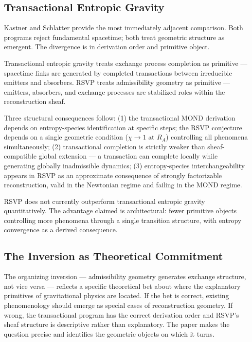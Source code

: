\documentclass[11pt, a4paper]{article}
\theoremstyle{plain}
\theoremstyle{definition}
\theoremstyle{remark}
\newcommand{\RA}{R_{\!A}}
\begin{document}
\subsection{Transactional Entropic Gravity}

Kastner and Schlatter \cite{kastner2024} provide the most immediately adjacent
comparison. Both programs reject fundamental spacetime; both treat geometric structure
as emergent. The divergence is in derivation order and primitive object.

Transactional entropic gravity treats exchange process completion as primitive ---
spacetime links are generated by completed transactions between irreducible emitters
and absorbers. RSVP treats admissibility geometry as primitive --- emitters,
absorbers, and exchange processes are stabilized roles within the reconstruction
sheaf.

Three structural consequences follow: (1) the transactional MOND derivation depends
on entropy-species identification at specific steps; the RSVP conjecture depends on a
single geometric condition ($\chi \to 1$ at $\RA$) controlling all phenomena
simultaneously; (2) transactional completion is strictly weaker than sheaf-compatible
global extension --- a transaction can complete locally while generating globally
inadmissible dynamics; (3) entropy-species interchangeability appears in RSVP as an
approximate consequence of strongly factorizable reconstruction, valid in the
Newtonian regime and failing in the MOND regime.

RSVP does not currently outperform transactional entropic gravity quantitatively. The
advantage claimed is architectural: fewer primitive objects controlling more phenomena
through a single transition structure, with entropy convergence as a derived
consequence.

\subsection{The Inversion as Theoretical Commitment}

The organizing inversion --- admissibility geometry generates exchange structure, not
vice versa --- reflects a specific theoretical bet about where the explanatory
primitives of gravitational physics are located. If the bet is correct, existing
phenomenology should emerge as special cases of reconstruction geometry. If wrong,
the transactional program has the correct derivation order and RSVP's sheaf structure
is descriptive rather than explanatory. The paper makes the question precise and
identifies the geometric objects on which it turns.
\end{document}
